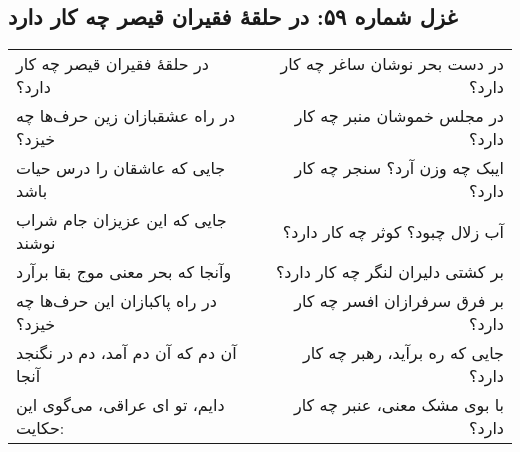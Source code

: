 \begin{center}
\section*{غزل شماره ۵۹: در حلقهٔ فقیران قیصر چه کار دارد}
\label{sec:059}
\begin{longtable}{l p{0.5cm} r}
در حلقهٔ فقیران قیصر چه کار دارد؟
&&
در دست بحر نوشان ساغر چه کار دارد؟
\\
در راه عشقبازان زین حرف‌ها چه خیزد؟
&&
در مجلس خموشان منبر چه کار دارد؟
\\
جایی که عاشقان را درس حیات باشد
&&
ایبک چه وزن آرد؟ سنجر چه کار دارد؟
\\
جایی که این عزیزان جام شراب نوشند
&&
آب زلال چبود؟ کوثر چه کار دارد؟
\\
وآنجا که بحر معنی موج بقا برآرد
&&
بر کشتی دلیران لنگر چه کار دارد؟
\\
در راه پاکبازان این حرف‌ها چه خیزد؟
&&
بر فرق سرفرازان افسر چه کار دارد؟
\\
آن دم که آن دم آمد، دم در نگنجد آنجا
&&
جایی که ره برآید، رهبر چه کار دارد؟
\\
دایم، تو ای عراقی، می‌گوی این حکایت:
&&
با بوی مشک معنی، عنبر چه کار دارد؟
\\
\end{longtable}
\end{center}
